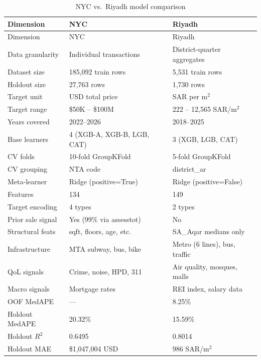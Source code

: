 \documentclass[11pt, a4paper, twoside]{report}
\begin{document}
\begin{longtable}{lll}
  \caption{NYC vs.\ Riyadh model comparison} \\
  \toprule Dimension & NYC & Riyadh \\ \midrule \endfirsthead
  \midrule Dimension & NYC & Riyadh \\ \midrule \endhead \bottomrule \endfoot
  Data granularity  & Individual transactions & District-quarter aggregates \\
  Dataset size      & 185,092 train rows      & 5,531 train rows \\
  Holdout size      & 27,763 rows             & 1,730 rows \\
  Target unit       & USD total price         & SAR per m$^2$ \\
  Target range      & \$50K -- \$100M         & 222 -- 12,565 SAR/m$^2$ \\
  Years covered     & 2022--2026              & 2018--2025 \\
  Base learners     & 4 (XGB-A, XGB-B, LGB, CAT) & 3 (XGB, LGB, CAT) \\
  CV folds          & 10-fold GroupKFold      & 5-fold GroupKFold \\
  CV grouping       & NTA code                & district\_ar \\
  Meta-learner      & Ridge (positive=True)   & Ridge (positive=False) \\
  Features          & 134                     & 149 \\
  Target encoding   & 4 types                 & 2 types \\
  Prior sale signal & Yes (99\% via assesstot)& No \\
  Structural feats  & sqft, floors, age, etc. & SA\_Aqar medians only \\
  Infrastructure    & MTA subway, bus, bike   & Metro (6 lines), bus, traffic \\
  QoL signals       & Crime, noise, HPD, 311  & Air quality, mosques, malls \\
  Macro signals     & Mortgage rates          & REI index, salary data \\
  OOF MedAPE        & ---                     & 8.25\% \\
  Holdout MedAPE    & 20.32\%                 & 15.59\% \\
  Holdout $R^2$     & 0.6495                  & 0.8014 \\
  Holdout MAE       & \$1,047,004 USD         & 986 SAR/m$^2$ \\
\end{longtable}
\end{document}

